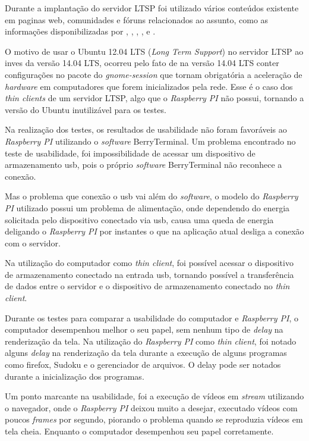 \documentclass[
	12pt,				%
	openright,			%
	twoside,			%
	a4paper,			%
	chapter=TITLE,		%
	english,			%
	brazil				%
	]{abntex2}
\begin{document}
Durante a implantação do servidor LTSP foi utilizado vários conteúdos existente em paginas web, comunidades e fóruns relacionados ao assunto, como as informações disponibilizadas por , , , ,  e .

O motivo de usar o Ubuntu 12.04 LTS (\textit{Long Term Support}) no servidor LTSP ao inves da versão 14.04 LTS, ocorreu pelo fato de na versão 14.04 LTS conter configurações no pacote do \textit{gnome-session} que tornam obrigatória a aceleração de \textit{hardware} em computadores que forem inicializados pela rede. Esse é o caso dos \textit{thin clients} de um servidor LTSP, algo que o \textit{Raspberry PI} não possui, tornando a versão do Ubuntu inutilizável para os testes.

Na realização dos testes, os resultados de usabilidade não foram favoráveis ao \textit{Raspberry PI} utilizando o \textit{software} BerryTerminal. Um problema encontrado no teste de usabilidade, foi impossibilidade de acessar um dispositivo de armazenamento usb, pois o próprio \textit{software} BerryTerminal não reconhece a conexão.

Mas o problema que conexão o usb vai além do \textit{software}, o modelo do \textit{Raspberry PI} utilizado possui um problema de alimentação, onde dependendo do energia solicitada pelo dispositivo conectado via usb, causa uma queda de energia deligando o \textit{Raspberry PI} por instantes o que na aplicação atual desliga a conexão com o servidor.

Na utilização do computador como \textit{thin client}, foi possível acessar o dispositivo de armazenamento conectado na entrada usb, tornando possível  a transferência de dados entre o servidor e o dispositivo de armazenamento conectado no \textit{thin client}.

Durante os testes para comparar a usabilidade do computador e \textit{Raspberry PI}, o computador desempenhou melhor o seu papel, sem nenhum tipo de \textit{delay} na renderização da tela.  Na utilização do \textit{Raspberry PI} como \textit{thin client}, foi notado alguns \textit{delay} na renderização da tela durante a execução de alguns programas como firefox, Sudoku e o gerenciador de arquivos. O delay pode ser notados durante a inicialização dos programas.

Um ponto marcante na usabilidade, foi a execução de vídeos em \textit{stream} utilizando o navegador, onde o \textit{Raspberry PI} deixou muito a desejar, executado vídeos com poucos \textit{frames} por segundo, piorando o problema quando se reproduzia vídeos em tela cheia. Enquanto o computador desempenhou seu papel corretamente.
\end{document}
